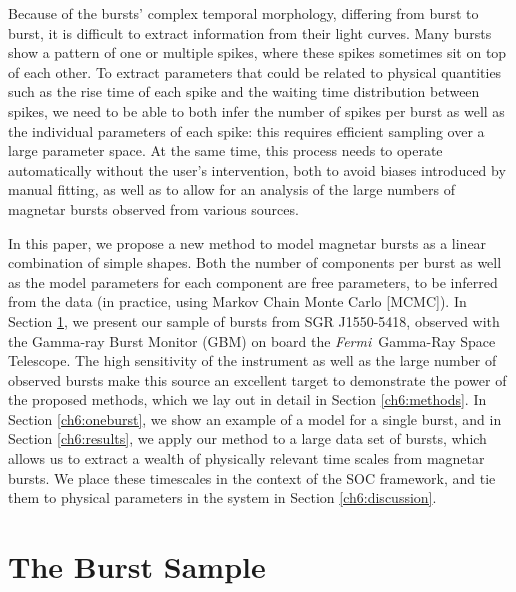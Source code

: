 \documentclass[12pt]{emulateapj}
\newcommand{\project}[1]{\textsl{#1}}
\newcommand{\fermi}{\project{Fermi}}
\begin{document}
Because of the bursts' complex temporal morphology, differing from burst to burst, it is difficult to extract information from their light curves. 
Many bursts show a pattern of one or multiple spikes, where these spikes sometimes sit on top of each other. To extract parameters that could be related
to physical quantities such as the rise time of each spike and the waiting time distribution between spikes, we need to be able to both infer the 
number of spikes per burst as well as the individual parameters of each spike: this requires efficient sampling over a large parameter space.
At the same time, this process needs to operate automatically without the user's intervention, both to avoid biases introduced by manual fitting, as well as
 to allow for an analysis of the large numbers of magnetar bursts observed from various sources.

In this paper, we propose a new method to model magnetar bursts as a linear combination of simple shapes. Both the number of components
per burst as well as the model parameters for each component are free parameters, to be inferred from the data (in practice, using
Markov Chain Monte Carlo [MCMC]). In Section \ref{ch6:data}, we present our sample of bursts from SGR J1550-5418, observed with the 
Gamma-ray Burst Monitor (GBM) on board the \fermi\ Gamma-Ray Space Telescope.
The high sensitivity of the instrument as well as 
the large number of observed bursts make this source an excellent target to demonstrate the power of the proposed methods, which we
lay out in detail in Section \ref{ch6:methods}.
In Section \ref{ch6:oneburst}, we show an example of a model for a single burst, and in Section \ref{ch6:results}, we apply our method to a large data set of bursts, 
which allows us to extract a wealth of physically relevant time scales from magnetar bursts. 
We place these timescales in the context of the SOC framework, and tie them to physical parameters in the system in Section \ref{ch6:discussion}.



\section{The Burst Sample}
\label{ch6:data}
\end{document}
